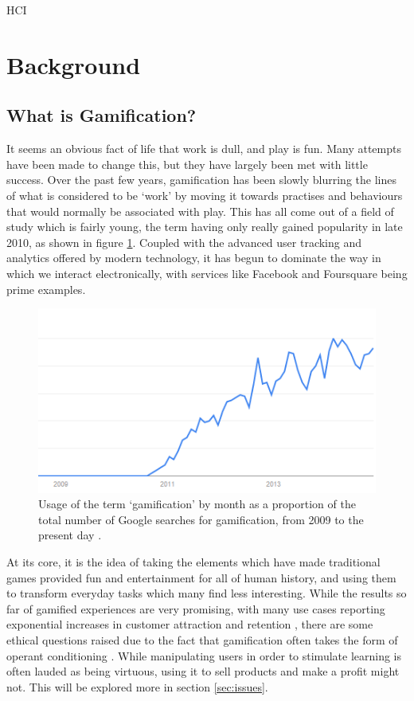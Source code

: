 \documentclass[12pt]{article}
\begin{document}
HCI

\section{Background}
\subsection{What is Gamification?}
It seems an obvious fact of life that work is dull, and play is fun. Many attempts have been made to change this, but they have largely been met with little success. Over the past few years, gamification has been slowly blurring the lines of what is considered to be `work' by moving it towards practises and behaviours that would normally be associated with play. This has all come out of a field of study which is fairly young, the term having only really gained popularity in late 2010, as shown in figure \ref{usagegraph}. Coupled with the advanced user tracking and analytics offered by modern technology, it has begun to dominate the way in which we interact electronically, with services like Facebook and Foursquare being prime examples.

\begin{figure}[p]
	\includegraphics{../img/usage-graph.png}
	\caption{Usage of the term `gamification' by month as a proportion of the total number of Google searches for gamification, from 2009 to the present day \cite{usage}.}
	\label{usagegraph}
\end{figure}

At its core, it is the idea of taking the elements which have made traditional games provided fun and entertainment for all of human history, and using them to transform everyday tasks which many find less interesting. While the results so far of gamified experiences are very promising, with many use cases reporting exponential increases in customer attraction and retention \cite{zichermann2010game}, there are some ethical questions raised due to the fact that gamification often takes the form of operant conditioning \cite{kapp2012gamification}. While manipulating users in order to stimulate learning is often lauded as being virtuous, using it to sell products and make a profit might not. This will be explored more in section \ref{sec:issues}.
\end{document}
